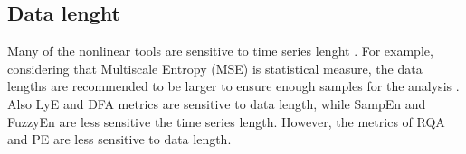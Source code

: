 


%
%









\subsection{Data lenght}
Many of the nonlinear tools are sensitive to time series lenght \cite{caballero2014}.
For example, considering that Multiscale Entropy (MSE) is 
statistical measure, the data lengths are recommended to be larger to ensure 
enough samples for the analysis \cite{costa2007}. 
Also LyE \cite{wolf1985} and  DFA \cite{peng1995} metrics are sensitive to data length, 
while SampEn \cite{rhea2011} and FuzzyEn \cite{richman2000, chen2007} 
are less sensitive the time series length.
However, the metrics of RQA \cite{webber1994, riley1999, wijnants2009}
and PE \cite{zunino2009}
are less sensitive to data length.



